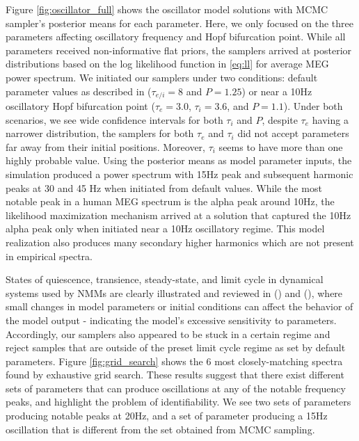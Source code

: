 Figure \ref{fig:oscillator_full} shows the oscillator model solutions with MCMC sampler's posterior means for each parameter. Here, we only focused on the three parameters affecting oscillatory frequency and Hopf bifurcation point. While all parameters received non-informative flat priors, the samplers arrived at posterior distributions based on the log likelihood function in \ref{eq:ll} for average MEG power spectrum. We initiated our samplers under two conditions: default parameter values as described in \cite{muldoon_stimulation-based_2016} ($\tau_{e/i} = 8$ and $P=1.25$) or near a 10Hz oscillatory Hopf bifurcation point ($\tau_e = 3.0$, $\tau_i = 3.6$, and $P=1.1$). Under both scenarios, we see wide confidence intervals for both $\tau_i$ and $P$, despite $\tau_e$ having a narrower distribution, the samplers for both $\tau_e$ and $\tau_i$ did not accept parameters far away from their initial positions. Moreover, $\tau_i$ seems to have more than one highly probable value. Using the posterior means as model parameter inputs, the simulation produced a power spectrum with 15Hz peak and subsequent harmonic peaks at 30 and 45 Hz when initiated from default values. While the most notable peak in a human MEG spectrum is the alpha peak around 10Hz, the likelihood maximization mechanism arrived at a solution that captured the 10Hz alpha peak only when initiated near a 10Hz oscillatory regime. This model realization also produces many secondary higher harmonics which are not present in empirical spectra.

States of quiescence, transience, steady-state, and limit cycle in dynamical systems used by NMMs are clearly illustrated and reviewed in (\cite{breakspear_dynamic_2017}) and (\cite{sanz-leon_mathematical_2015}), where small changes in model parameters or initial conditions can affect the behavior of the model output - indicating the model's excessive sensitivity to parameters. Accordingly, our samplers also appeared to be stuck in a certain regime and reject samples that are outside of the preset limit cycle regime as set by default parameters. Figure \ref{fig:grid_search} shows the 6 most closely-matching spectra found by exhaustive grid search. These results suggest that there exist different sets of parameters that can produce oscillations at any of the notable frequency peaks, and highlight the problem of identifiability. We see two sets of parameters producing notable peaks at 20Hz, and a set of parameter producing a 15Hz oscillation that is different from the set obtained from MCMC sampling. 

